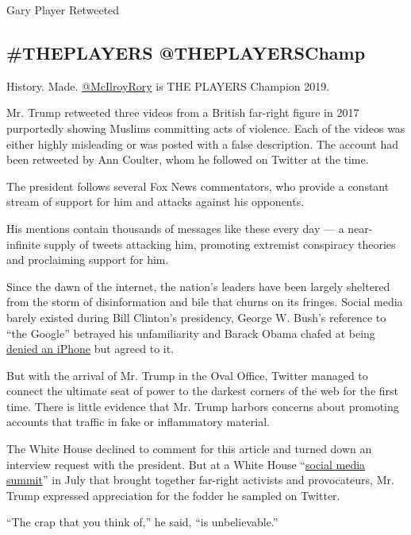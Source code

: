 Gary Player Retweeted

\hypertarget{theplayers-theplayerschamp}{%
\subsection{\#THEPLAYERS
@THEPLAYERSChamp}\label{theplayers-theplayerschamp}}

History. Made. \href{https://www.twitter.com/McIlroyRory}{@McIlroyRory}
is THE PLAYERS Champion 2019.

Mr. Trump retweeted three videos from a British far-right figure in 2017
purportedly showing Muslims committing acts of violence. Each of the
videos was either highly misleading or was posted with a false
description. The account had been retweeted by Ann Coulter, whom he
followed on Twitter at the time.

The president follows several Fox News commentators, who provide a
constant stream of support for him and attacks against his opponents.

His mentions contain thousands of messages like these every day --- a
near-infinite supply of tweets attacking him, promoting extremist
conspiracy theories and proclaiming support for him.

Since the dawn of the internet, the nation's leaders have been largely
sheltered from the storm of disinformation and bile that churns on its
fringes. Social media barely existed during Bill Clinton's presidency,
George W. Bush's reference to ``the Google'' betrayed his unfamiliarity
and Barack Obama chafed at being
\href{https://fortune.com/2016/06/10/president-obamas-new-smartphone-is-more-like-a-toddler-phone/}{denied
an iPhone} but agreed to it.

But with the arrival of Mr. Trump in the Oval Office, Twitter managed to
connect the ultimate seat of power to the darkest corners of the web for
the first time. There is little evidence that Mr. Trump harbors concerns
about promoting accounts that traffic in fake or inflammatory material.

The White House declined to comment for this article and turned down an
interview request with the president. But at a White House
``\href{https://www.nytimes.com/2019/07/11/us/politics/white-house-social-media-summit.html?searchResultPosition=2}{social
media summit}'' in July that brought together far-right activists and
provocateurs, Mr. Trump expressed appreciation for the fodder he sampled
on Twitter.

``The crap that you think of,'' he said, ``is unbelievable.''

